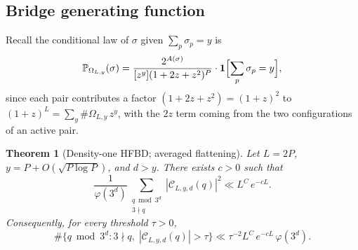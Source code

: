 \documentclass[11pt,a4paper]{amsart}
\theoremstyle{plain}
\newtheorem{theorem}{Theorem}[section]
\theoremstyle{definition}
\newcommand{\PP}{\mathbb{P}}
\begin{document}
\subsection{Bridge generating function}
Recall the conditional law of $\sigma$ given $\sum_p\sigma_p=y$ is
\begin{equation}\label{eq:sigmalaw}
\PP_{\Omega_{L,y}}(\sigma)
=\frac{2^{A(\sigma)}}{[z^y](1+2z+z^2)^P}
\cdot\mathbf 1\Bigl[\sum_p\sigma_p=y\Bigr],
\end{equation}
since each pair contributes a factor $(1+2z+z^2)=(1+z)^2$ to
$(1+z)^L=\sum_y\#\Omega_{L,y}\,z^y$, with the $2z$ term coming from the
two configurations of an active pair.

\begin{theorem}[Density-one HFBD; averaged flattening]\label{thm:R}
Let $L=2P$, $y=P+O(\sqrt{P\log P})$, and $d>y$.
There exists $c>0$ such that
\begin{equation}\label{eq:Rbound}
\frac{1}{\varphi(3^d)}\sum_{\substack{q\bmod 3^d\\3\nmid q}}|\mathcal C_{L,y,d}(q)|^2
\ll L^C\,e^{-cL}.
\end{equation}
Consequently, for every threshold $\tau>0$,
$$
\#\{q\bmod 3^d:3\nmid q,\;|\mathcal C_{L,y,d}(q)|>\tau\}
\ll\tau^{-2}L^C\,e^{-cL}\,\varphi(3^d).
$$
\end{theorem}
\end{document}
